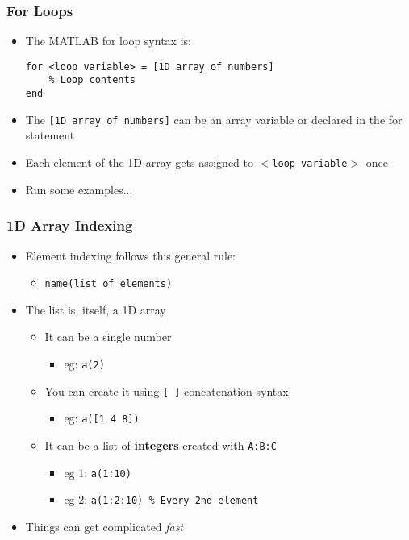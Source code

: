 \documentclass[14pt]{beamer}
\begin{document}
\begin{frame}[fragile]
\frametitle{For Loops}
\begin{itemize}
\item The MATLAB for loop syntax is:
\begin{lstlisting}[style=pseudo]
for <loop variable> = [1D array of numbers]
	% Loop contents
end
\end{lstlisting}
\item The \texttt{[1D array of numbers]} can be an array variable or declared in the for statement
\item Each element of the 1D array gets assigned to \texttt{$<$loop variable$>$} once
\item Run some examples...
\end{itemize}
\end{frame}

\begin{frame}
\frametitle{1D Array Indexing}
\begin{itemize}
\item Element indexing follows this general rule:
	\begin{itemize}
		\item \texttt{name(list of elements)}
	\end{itemize}
\item The list is, itself, a 1D array
	\begin{itemize}
		\item It can be a single number
			\begin{itemize}
				\item eg: \texttt{a(2)}
			\end{itemize}
		\item You can create it using \texttt{[ ]} concatenation syntax
		\begin{itemize}
			\item eg: \texttt{a([1 4 8])}
		\end{itemize}
		\item It can be a list of \textbf{integers} created with \texttt{A:B:C}
			\begin{itemize}
				\item eg 1: \texttt{a(1:10)}
				\item eg 2: \texttt{a(1:2:10) \% Every 2nd element}
			\end{itemize}
	\end{itemize}
\item Things can get complicated \textit{fast}
\end{itemize}
\end{frame}
\end{document}
